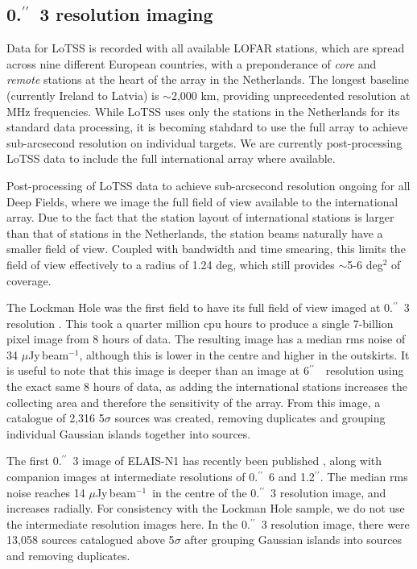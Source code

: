\documentclass[usenatbib,fleqn,letters]{mnras}
\newcommand{\sarc}{$^{\prime\prime}\!\!$}
\newcommand{\muJybm}{$\mu$Jy$\,$beam$^{-1}$}
\begin{document}
\subsection{0.\sarc\ 3 resolution imaging}
\label{subsec:highres}

Data for LoTSS is recorded with all available LOFAR stations, which are spread across nine different European countries, with a preponderance of \textit{core} and \textit{remote} stations at the heart of the array in the Netherlands. The longest baseline (currently Ireland to Latvia) is $\sim$2,000 km, providing unprecedented resolution at MHz frequencies. While LoTSS uses only the stations in the Netherlands for its standard data processing, it is becoming stahdard to use the full array to achieve sub-arcsecond resolution \citep[e.g.,]{morabito_sub-arcsecond_2022} on individual targets. We are currently post-processing LoTSS data to include the full international array where available. 

Post-processing of LoTSS data to achieve sub-arcsecond resolution ongoing for all Deep Fields, where we image the full field of view available to the international array. Due to the fact that the station layout of international stations is larger than that of stations in the Netherlands, the station beams naturally have a smaller field of view. Coupled with bandwidth and time smearing, this limits the field of view effectively to a radius of 1.24 deg, which still provides $\sim$5-6 deg$^2$ of coverage. 

The Lockman Hole was the first field to have its full field of view imaged at 0.\sarc\ 3 resolution \citep{sweijen_deep_2022}. This took a quarter million cpu hours to produce a single 7-billion pixel image from 8 hours of data. The resulting image has a median rms noise of 34 \muJybm , although this is lower in the centre and higher in the outskirts. It is useful to note that this image is deeper than an image at 6\sarc\ \ resolution using the exact same 8 hours of data, as adding the international stations increases the collecting area and therefore the sensitivity of the array. From this image, a catalogue of 2,316 5$\sigma$ sources was created, removing duplicates and grouping individual Gaussian islands together into sources. 

The first 0.\sarc\ 3 image of ELAIS-N1 has recently been published \citep{de_jong_into_2024}, along with companion images at intermediate resolutions of 0.\sarc\ 6 and 1.2\sarc . The median rms noise reaches 14 \muJybm\ in the centre of the 0.\sarc\ 3 resolution image, and increases radially. For consistency with the Lockman Hole sample, we do not use the intermediate resolution images here. In the 0.\sarc\ 3 resolution image, there were 13,058 sources catalogued above 5$\sigma$ after grouping Gaussian islands into sources and removing duplicates. 
\end{document}
